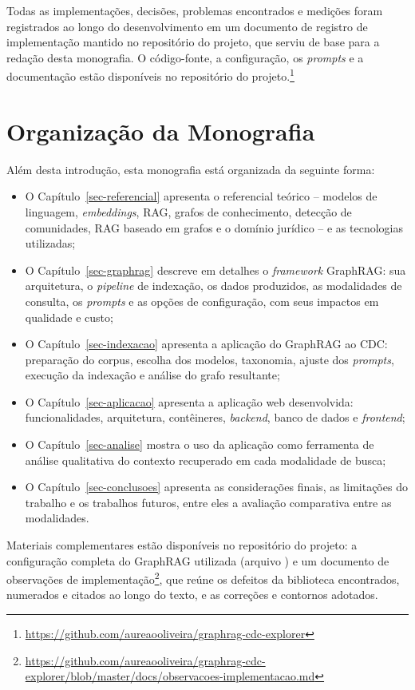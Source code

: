 Todas as implementações, decisões, problemas encontrados e medições foram registrados ao longo do desenvolvimento em um documento de registro de implementação mantido no repositório do projeto, que serviu de base para a redação desta monografia. O código-fonte, a configuração, os \textit{prompts} e a documentação estão disponíveis no repositório do projeto.\footnote{\url{https://github.com/aureaooliveira/graphrag-cdc-explorer}}

\section{Organização da Monografia}
\label{sec-intro-organizacao}

Além desta introdução, esta monografia está organizada da seguinte forma:

\begin{itemize}
	\item O Capítulo~\ref{sec-referencial} apresenta o referencial teórico -- modelos de linguagem, \textit{embeddings}, RAG, grafos de conhecimento, detecção de comunidades, RAG baseado em grafos e o domínio jurídico -- e as tecnologias utilizadas;

	\item O Capítulo~\ref{sec-graphrag} descreve em detalhes o \textit{framework} GraphRAG: sua arquitetura, o \textit{pipeline} de indexação, os dados produzidos, as modalidades de consulta, os \textit{prompts} e as opções de configuração, com seus impactos em qualidade e custo;

	\item O Capítulo~\ref{sec-indexacao} apresenta a aplicação do GraphRAG ao CDC: preparação do corpus, escolha dos modelos, taxonomia, ajuste dos \textit{prompts}, execução da indexação e análise do grafo resultante;

	\item O Capítulo~\ref{sec-aplicacao} apresenta a aplicação web desenvolvida: funcionalidades, arquitetura, contêineres, \textit{backend}, banco de dados e \textit{frontend};

	\item O Capítulo~\ref{sec-analise} mostra o uso da aplicação como ferramenta de análise qualitativa do contexto recuperado em cada modalidade de busca;

	\item O Capítulo~\ref{sec-conclusoes} apresenta as considerações finais, as limitações do trabalho e os trabalhos futuros, entre eles a avaliação comparativa entre as modalidades.
\end{itemize}

Materiais complementares estão disponíveis no repositório do projeto: a configuração completa do GraphRAG utilizada (arquivo ) e um documento de observações de implementação\footnote{\url{https://github.com/aureaooliveira/graphrag-cdc-explorer/blob/master/docs/observacoes-implementacao.md}}, que reúne os defeitos da biblioteca encontrados, numerados e citados ao longo do texto, e as correções e contornos adotados.

